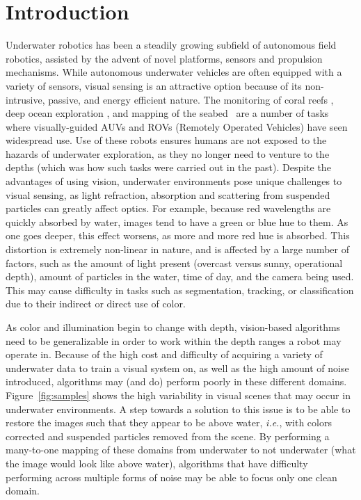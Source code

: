 \section{Introduction}
Underwater robotics has been a steadily growing subfield of autonomous field robotics, assisted by the advent of novel platforms, 
sensors and propulsion mechanisms. While autonomous underwater vehicles are often equipped with a variety of sensors, visual 
sensing is an attractive option because of its non-intrusive, passive, and energy efficient nature. The monitoring of coral reefs 
\cite{shkurti2012multi}, deep ocean exploration \cite{whitcomb2000advances}, and mapping of the seabed~\cite{bingham2010robotic} 
are a number of tasks where visually-guided AUVs and ROVs (Remotely Operated Vehicles) have seen widespread use. Use of these 
robots ensures humans are not exposed to the hazards of underwater exploration, as they no longer need to venture to the depths 
(which was how such tasks were carried out in the past). Despite the advantages of using vision, underwater environments pose 
unique challenges to visual sensing, as light refraction, absorption and scattering from suspended particles can greatly affect 
optics. For example, because red wavelengths are quickly absorbed by water, images tend to have a green or blue hue to them. As 
one goes deeper, this effect worsens, as more and more red hue is absorbed. This distortion is extremely non-linear in nature, and 
is affected by a large number of factors, such as the amount of light present (overcast versus sunny, operational depth), amount 
of particles in the water, time of day, and the camera being used. This may cause difficulty in tasks such as segmentation, 
tracking, or classification due to their indirect or direct use of color. 

As color and illumination begin to change with depth, vision-based algorithms need to be generalizable in order to work within 
the depth ranges a robot may operate in. Because of the high cost and difficulty of acquiring a variety of underwater data to 
train a visual system on, as well as the high amount of noise introduced, algorithms may (and do) perform poorly in these 
different domains. Figure~\ref{fig:samples} shows the high variability in visual scenes that may occur in underwater environments. 
A step towards a solution to this issue is to be able to restore the images such that they appear to be above water, \emph{i.e.}, 
with colors corrected and suspended particles removed from the scene. By performing a many-to-one mapping of these domains from 
underwater to not underwater (what the image would look like above water), algorithms that have difficulty performing across 
multiple forms of noise may be able to focus only one clean domain.

